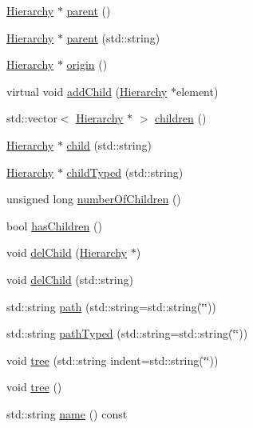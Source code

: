 \begin{DoxyCompactItemize}
\hyperlink{classHierarchy}{Hierarchy} $\ast$ \hyperlink{classHierarchy_a1c7bec8257e717f9c1465e06ebf845fc}{parent} ()
\item 
\hyperlink{classHierarchy}{Hierarchy} $\ast$ \hyperlink{classHierarchy_ad550588733bf75ac5c0fcfd7c8fd11a6}{parent} (std\+::string)
\item 
\hyperlink{classHierarchy}{Hierarchy} $\ast$ \hyperlink{classHierarchy_aee461dc930ce3871636ff87f075b1b83}{origin} ()
\item 
virtual void \hyperlink{classHierarchy_ad677774ff38fcb257c04a3a10d471fac}{add\+Child} (\hyperlink{classHierarchy}{Hierarchy} $\ast$element)
\item 
std\+::vector$<$ \hyperlink{classHierarchy}{Hierarchy} $\ast$ $>$ \hyperlink{classHierarchy_aa9a76f69e98e052ee1a6e32cea006288}{children} ()
\item 
\hyperlink{classHierarchy}{Hierarchy} $\ast$ \hyperlink{classHierarchy_a1e207f973c694b538bf90107b4868817}{child} (std\+::string)
\item 
\hyperlink{classHierarchy}{Hierarchy} $\ast$ \hyperlink{classHierarchy_a0c15a5276a3b80b4354d6bd8a01e0708}{child\+Typed} (std\+::string)
\item 
unsigned long \hyperlink{classHierarchy_ab16e84de65fd84e14001a6cf941c8be4}{number\+Of\+Children} ()
\item 
bool \hyperlink{classHierarchy_a255174fe4d316d2a3f430dcb9dab29f1}{has\+Children} ()
\item 
void \hyperlink{classHierarchy_a2b2b359fac003233f65786a616766bde}{del\+Child} (\hyperlink{classHierarchy}{Hierarchy} $\ast$)
\item 
void \hyperlink{classHierarchy_a1928ac7615fe0b5e55cd707f70dc6781}{del\+Child} (std\+::string)
\item 
std\+::string \hyperlink{classHierarchy_aa7990fa7caf132d83e361ce033c6c65a}{path} (std\+::string=std\+::string(\char`\"{}\char`\"{}))
\item 
std\+::string \hyperlink{classHierarchy_a1efd56cd164d328d2002e53a10a19b8c}{path\+Typed} (std\+::string=std\+::string(\char`\"{}\char`\"{}))
\item 
void \hyperlink{classHierarchy_a76e914b9a677a22a82deb74d892bf261}{tree} (std\+::string indent=std\+::string(\char`\"{}\char`\"{}))
\item 
void \hyperlink{classHierarchy_a594c294c5f60c230e106d522ed008212}{tree} ()
\item 
std\+::string \hyperlink{classObject_a300f4c05dd468c7bb8b3c968868443c1}{name} () const
\item 

\end{DoxyCompactItemize}
